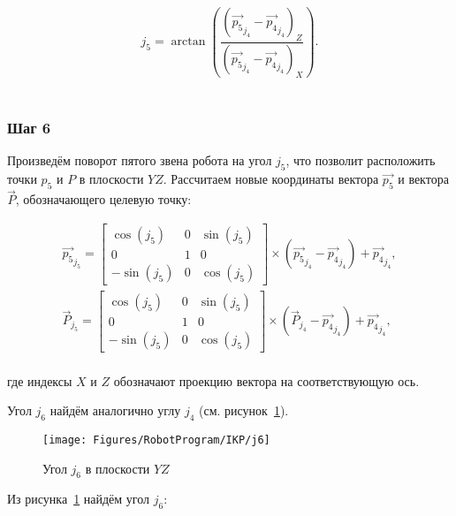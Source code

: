\begin{gather*}
    j_5 = \arctan \left( \dfrac
    {\left( \overrightarrow{p_5}_{j_4} - \overrightarrow{p_4}_{j_4} \right)_Z}
    {\left( \overrightarrow{p_5}_{j_4} - \overrightarrow{p_4}_{j_4} \right)_X} \right).
\end{gather*} \\

\subsubsection*{Шаг 6}
Произведём поворот пятого звена робота на угол $j_5$, что позволит расположить точки $p_5$ и $P$ в плоскости $YZ$.
Рассчитаем новые координаты вектора $\overrightarrow{p_5}$ и вектора $\overrightarrow{P}$, обозначающего целевую точку:

\begin{gather*}
    \overrightarrow{p_5}_{j_5} =
    \begin{bmatrix}
        \cos(j_5)  & 0 & \sin(j_5) \\
        0          & 1 & 0         \\
        -\sin(j_5) & 0 & \cos(j_5)
    \end{bmatrix} \times \left( \overrightarrow{p_5}_{j_4} - \overrightarrow{p_4}_{j_4} \right) + \overrightarrow{p_4}_{j_4}, \\
    \overrightarrow{P}_{j_5} =
    \begin{bmatrix}
        \cos(j_5)  & 0 & \sin(j_5) \\
        0          & 1 & 0         \\
        -\sin(j_5) & 0 & \cos(j_5)
    \end{bmatrix} \times \left( \overrightarrow{P}_{j_4} - \overrightarrow{p_4}_{j_4} \right) + \overrightarrow{p_4}_{j_4},
\end{gather*} \\
где индексы $X$ и $Z$ обозначают проекцию вектора на соответствующую ось.

Угол $j_6$ найдём аналогично углу $j_4$ (см. рисунок~\ref{fig:RobotProgram:IKP:j6}).

\begin{figure}[H]
    \centering
    \vspace{14pt}
    \texttt{[image: Figures/RobotProgram/IKP/j6]}
    \caption{Угол $j_6$ в плоскости $YZ$}
    \label{fig:RobotProgram:IKP:j6}
\end{figure}

Из рисунка~\ref{fig:RobotProgram:IKP:j6} найдём угол $j_6$:

